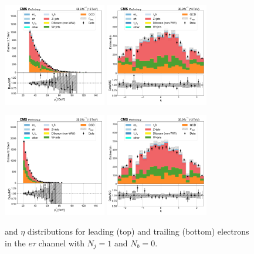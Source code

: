 \begin{figure}[htb!]
    \centering
    \includegraphics[width=0.4\textwidth]{chapters/Analysis/sectionPlots/figures/data_mc_overlays/etau_2016_cat_eq1_eq0_signal_linear_lepton_lepton1_pt}
    \includegraphics[width=0.4\textwidth]{chapters/Analysis/sectionPlots/figures/data_mc_overlays/etau_2016_cat_eq1_eq0_signal_linear_lepton_lepton1_eta}

    \includegraphics[width=0.4\textwidth]{chapters/Analysis/sectionPlots/figures/data_mc_overlays/etau_2016_cat_eq1_eq0_signal_linear_lepton_lepton2_pt}
    \includegraphics[width=0.4\textwidth]{chapters/Analysis/sectionPlots/figures/data_mc_overlays/etau_2016_cat_eq1_eq0_signal_linear_lepton_lepton2_eta}
    \caption{\pt and $\eta$ distributions for leading (top) and trailing
        (bottom) electrons in the $e\tau$ channel with $N_{j} = 1$ and
        $N_{b} = 0$.}
    \label{fig:analysis:plots:etau_2_kinematic}
\end{figure}

